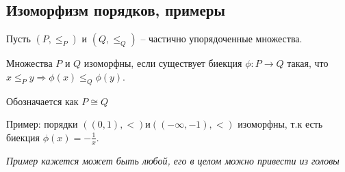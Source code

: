 \subsection{Изоморфизм порядков, примеры}

Пусть $(P, \le_P)$ и $(Q, \le_Q)$ -- частично упорядоченные множества.

Множества $P$ и $Q$ изоморфны, если существует биекция $\phi: P \rightarrow Q$ такая, что $x \le_P y \Rightarrow \phi(x) \le_Q \phi(y)$.

Обозначается как $P \cong Q$

Пример: порядки $((0, 1), <) и ((-\infty, -1), <)$ изоморфны, т.к есть биекция $\phi(x) = -\frac{1}{x}$.

\textit{Пример кажется может быть любой, его в целом можно привести из головы}

